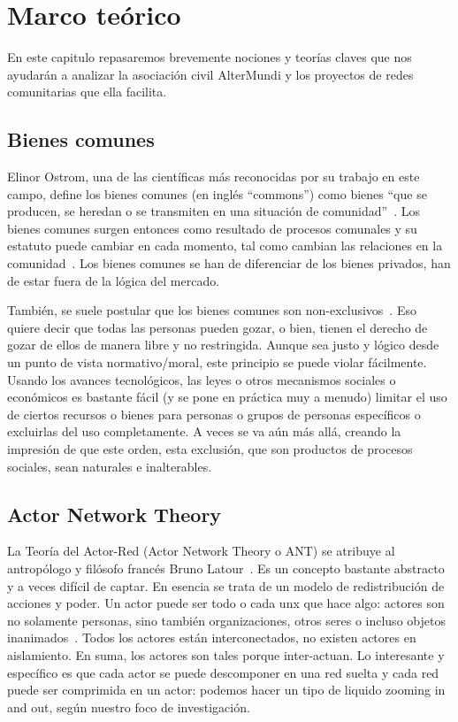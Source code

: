 \section{Marco teórico}

En este capitulo repasaremos brevemente nociones y teorías claves que nos ayudarán a analizar la asociación civil AlterMundi y los proyectos de redes comunitarias que ella facilita.

\subsection{Bienes comunes}

Elinor Ostrom, una de las científicas más reconocidas por su trabajo en este campo, define los bienes comunes (en inglés ``commons'') como bienes ``que se producen, se heredan o se transmiten en una situación de comunidad''~\autocite{Ostrom1990}.
Los bienes comunes surgen entonces como resultado de procesos comunales y su estatuto puede cambiar en cada momento, tal como cambian las relaciones en la comunidad~\autocite{Harvey2012}.
Los bienes comunes se han de diferenciar de los bienes privados, han de estar fuera de la lógica del mercado.

También, se suele postular que los bienes comunes son non-exclusivos~\autocite[86]{Helfrich2012}.
Eso quiere decir que todas las personas pueden gozar, o bien, tienen el derecho de gozar de ellos de manera libre y no restringida.
Aunque sea justo y lógico desde un punto de vista normativo/moral, este principio se puede violar fácilmente.
Usando los avances tecnológicos, las leyes o otros mecanismos sociales o económicos es bastante fácil (y se pone en práctica muy a menudo) limitar el uso de ciertos recursos o bienes para personas o grupos de personas específicos o excluirlas del uso completamente.
A veces se va aún más allá, creando la impresión de que este orden, esta exclusión, que son productos de procesos sociales, sean naturales e inalterables.

\subsection{Actor Network Theory}

La Teoría del Actor-Red (Actor Network Theory o ANT) se atribuye al antropólogo y filósofo francés Bruno Latour~\autocite{Latour2010}.
Es un concepto bastante abstracto y a veces difícil de captar.
En esencia se trata de un modelo de redistribución de acciones y poder.
Un actor puede ser todo o cada unx que hace algo: actores son no solamente personas, sino también organizaciones, otros seres o incluso objetos inanimados~\autocite{Venturini2010b}.
Todos los actores están interconectados, no existen actores en aislamiento.
En suma, los actores son tales porque inter-actuan.
Lo interesante y específico es que cada actor se puede descomponer en una red suelta y cada red puede ser comprimida en un actor:
podemos hacer un tipo de liquido zooming in and out, según nuestro foco de investigación.

